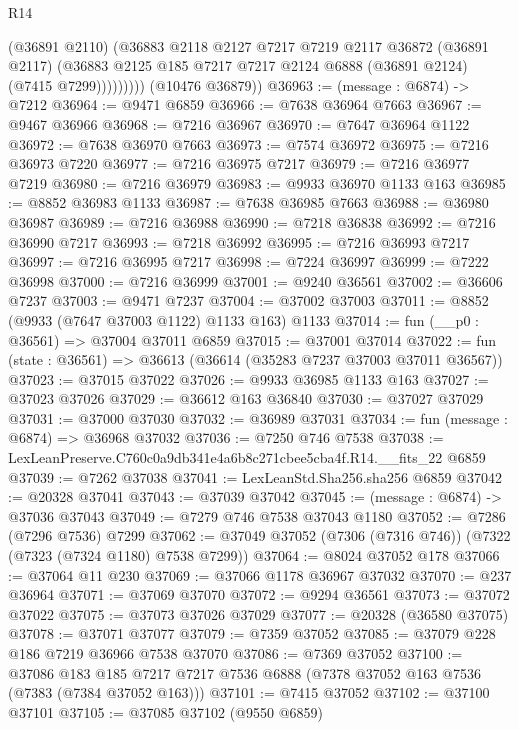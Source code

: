 \begin{lexlean}{R14}
\begin{coremodule}
                  (@36891 @2110)
                  (@36883
                    @2118
                    @2127
                    @7217
                    @7219
                    @2117
                    @36872
                    (@36891 @2117)
                    (@36883 @2125 @185 @7217 @7217 @2124 @6888 (@36891 @2124) (@7415 @7299)))))))))
      (@10476 @36879))
@36963 := (message : @6874) -> @7212
@36964 := @9471 @6859
@36966 := @7638 @36964 @7663
@36967 := @9467 @36966
@36968 := @7216 @36967
@36970 := @7647 @36964 @1122
@36972 := @7638 @36970 @7663
@36973 := @7574 @36972
@36975 := @7216 @36973 @7220
@36977 := @7216 @36975 @7217
@36979 := @7216 @36977 @7219
@36980 := @7216 @36979
@36983 := @9933 @36970 @1133 @163
@36985 := @8852 @36983 @1133
@36987 := @7638 @36985 @7663
@36988 := @36980 @36987
@36989 := @7216 @36988
@36990 := @7218 @36838
@36992 := @7216 @36990 @7217
@36993 := @7218 @36992
@36995 := @7216 @36993 @7217
@36997 := @7216 @36995 @7217
@36998 := @7224 @36997
@36999 := @7222 @36998
@37000 := @7216 @36999
@37001 := @9240 @36561
@37002 := @36606 @7237
@37003 := @9471 @7237
@37004 := @37002 @37003
@37011 := @8852 (@9933 (@7647 @37003 @1122) @1133 @163) @1133
@37014 := fun (__p0 : @36561) => @37004 @37011 @6859
@37015 := @37001 @37014
@37022 := fun (state : @36561) => @36613 (@36614 (@35283 @7237 @37003 @37011 @36567))
@37023 := @37015 @37022
@37026 := @9933 @36985 @1133 @163
@37027 := @37023 @37026
@37029 := @36612 @163 @36840
@37030 := @37027 @37029
@37031 := @37000 @37030
@37032 := @36989 @37031
@37034 := fun (message : @6874) => @36968 @37032
@37036 := @7250 @746 @7538
@37038 := LexLeanPreserve.C760c0a9db341e4a6b8c271cbee5cba4f.R14.__fits_22 @6859
@37039 := @7262 @37038
@37041 := LexLeanStd.Sha256.sha256 @6859
@37042 := @20328 @37041
@37043 := @37039 @37042
@37045 := (message : @6874) -> @37036 @37043
@37049 := @7279 @746 @7538 @37043 @1180
@37052 := @7286 (@7296 @7536) @7299
@37062 := @37049 @37052 (@7306 (@7316 @746)) (@7322 (@7323 (@7324 @1180) @7538 @7299))
@37064 := @8024 @37052 @178
@37066 := @37064 @11 @230
@37069 := @37066 @1178 @36967 @37032
@37070 := @237 @36964
@37071 := @37069 @37070
@37072 := @9294 @36561
@37073 := @37072 @37022
@37075 := @37073 @37026 @37029
@37077 := @20328 (@36580 @37075)
@37078 := @37071 @37077
@37079 := @7359 @37052
@37085 := @37079 @228 @186 @7219 @36966 @7538 @37070
@37086 := @7369 @37052
@37100 := @37086
    @183
    @185
    @7217
    @7217
    @7536
    @6888
    (@7378 @37052 @163 @7536 (@7383 (@7384 @37052 @163)))
@37101 := @7415 @37052
@37102 := @37100 @37101
@37105 := @37085 @37102 (@9550 @6859)

\end{coremodule}
\end{lexlean}
